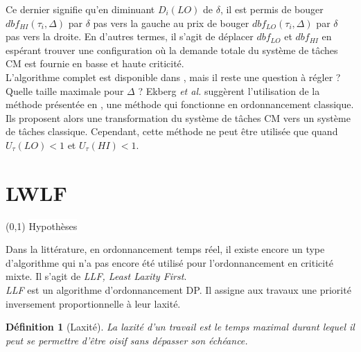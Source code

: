\documentclass[12pt,a4paper,oneside]{book}
\theoremstyle{break}
\newtheorem{defin}{Définition}[chapter]
\theoremstyle{breakplain}
\begin{document}
Ce dernier signifie qu'en diminuant $D_i(LO)$ de $\delta$, il est permis de bouger $dbf_{HI}(\tau_i, \Delta)$ par $\delta$ pas vers la gauche au prix de bouger $dbf_{LO}(\tau_i, \Delta)$ par $\delta$ pas vers la droite. En d'autres termes, il s'agit de déplacer $dbf_{LO}$ et $dbf_{HI}$ en espérant trouver une configuration où la demande totale du système de tâches CM est fournie en basse et haute criticité.\\

L'algorithme complet est disponible dans \cite{ekberg2012outstanding}, mais il reste une question à régler ? Quelle taille maximale pour $\Delta$ ? Ekberg \textit{et al.} suggèrent l'utilisation de la méthode présentée en \cite{baruah1990preemptively}, une méthode qui fonctionne en ordonnancement classique. Ils proposent alors une transformation du système de tâches CM vers un système de tâches classique. Cependant, cette méthode ne peut être utilisée que quand $U_\tau(LO) < 1$ et $U_\tau(HI) < 1$.

\section{LWLF}
\begin{center}
\boxput*(0,1){
\colorbox{white}{Hypothèses}
}{
\setlength{\fboxsep}{6pt}
}

\end{center}

Dans la littérature, en ordonnancement temps réel, il existe encore un type d'algorithme qui n'a pas encore été utilisé pour l'ordonnancement en criticité mixte. Il s'agit de \textit{LLF, Least Laxity First}.\\

\textit{LLF} est un algorithme d'ordonnancement DP. Il assigne aux travaux une priorité inversement proportionnelle à leur laxité.\\

\begin{defin}[Laxité\cite{goossens1999scheduling}]
La laxité d'un travail est le temps maximal durant lequel il peut se permettre d'être oisif sans dépasser son échéance.
\end{defin}
\end{document}
